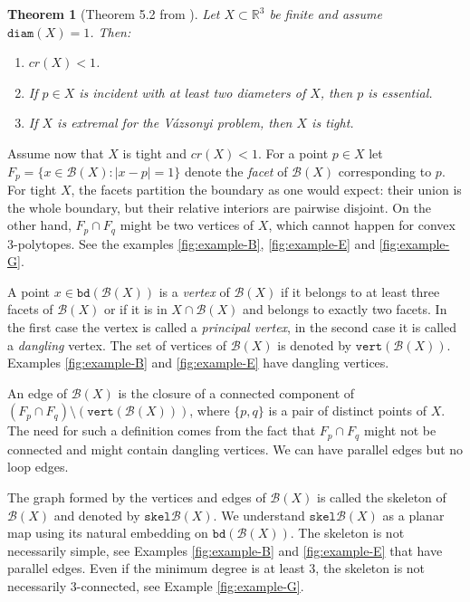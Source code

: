 \documentclass[10pt,a4paper]{article}
\newtheorem{theorem}{Theorem}[section]
\newcounter{example}
\newcommand{\R}[0]{\mathbb{R}}
\newcommand{\Bc}[0]{\mathcal{B}}
\newcommand{\skel}[0]{\mathtt{skel}}
\newcommand{\bd}[0]{\mathtt{bd}}
\newcommand{\diam}[0]{\mathtt{diam}}
\newcommand{\vertices}[0]{\mathtt{vert}}
\begin{document}
\begin{theorem}[Theorem 5.2 from \cite{kupitz2010ball}]
Let \(X\subset\R^3\) be finite and assume \(\diam(X)=1\).  Then:
\begin{enumerate}[label=\textup{(\roman*)}]
    \item \(cr(X)<1\).
    \item If \(p\in X\) is incident with at least two diameters of \(X\),
    then \(p\) is essential.
    \item If \(X\) is extremal for the Vázsonyi problem, then \(X\) is tight.
\end{enumerate}
\end{theorem}

Assume now that \(X\) is tight and \(cr(X)<1\).  For a point $p \in X$ let $F_p = \{x \in
\Bc(X) : |x - p| = 1\}$ denote the \emph{facet} of $\Bc(X)$ corresponding to $p$. For tight $X$, the facets partition the boundary as one would expect: their union is the whole boundary, but their relative interiors are pairwise disjoint. On the other hand, $F_p\cap F_q$ might be two vertices of $X$, which cannot happen for convex 3-polytopes. See the examples \ref{fig:example-B}, \ref{fig:example-E} and \ref{fig:example-G}.

 A point $x\in \bd(\Bc(X))$ is a \emph{vertex} of $\Bc(X)$ if it belongs to at least three facets of $\Bc(X)$ or if it is in $X\cap \Bc(X)$ and belongs to exactly two facets. In the first case the vertex is called a \emph{principal vertex}, in the second case it is called a \emph{dangling} vertex. The set of vertices of $\Bc(X)$ is denoted by $\vertices(\Bc(X))$. Examples \ref{fig:example-B} and \ref{fig:example-E} have dangling vertices. 

  An edge of $\Bc(X)$ is the closure of a connected component of $(F_p\cap F_q) \setminus (\vertices(\Bc(X)))$, where $\{p, q\}$ is a pair of distinct points of $X$. The need for such a definition comes from the fact that $F_p\cap F_q$ might not be connected and might contain dangling vertices. We can have parallel edges but no loop edges.

 The graph formed by the vertices and edges of $\Bc(X)$ is called the skeleton of $\Bc(X)$ and denoted by $\skel \Bc(X)$. We understand $\skel \Bc(X)$ as a planar map using its natural embedding on $\bd (\Bc(X))$. The skeleton is not necessarily simple, see Examples \ref{fig:example-B} and \ref{fig:example-E} that have parallel edges. Even if the minimum degree is at least 3, the skeleton is not necessarily 3-connected, see Example \ref{fig:example-G}. 
\end{document}
